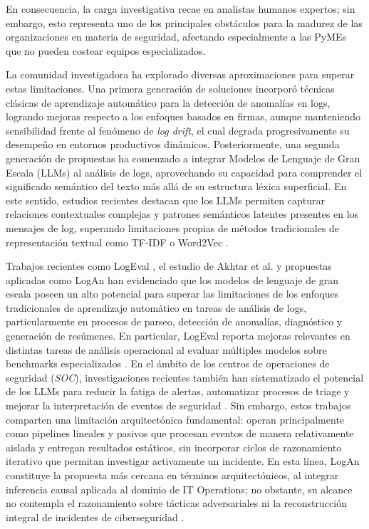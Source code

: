 En consecuencia, la carga investigativa recae en analistas humanos expertos; sin embargo, esto representa uno de los principales obstáculos para la madurez de las organizaciones en materia de seguridad, afectando especialmente a las PyMEs que no pueden costear equipos especializados.

La comunidad investigadora ha explorado diversas aproximaciones para superar estas limitaciones. Una primera generación de soluciones incorporó técnicas clásicas de aprendizaje automático para la detección de anomalías en logs, logrando mejoras respecto a los enfoques basados en firmas, aunque manteniendo sensibilidad frente al fenómeno de \textit{log drift}, el cual degrada progresivamente su desempeño en entornos productivos dinámicos. Posteriormente, una segunda generación de propuestas ha comenzado a integrar Modelos de Lenguaje de Gran Escala (LLMs) al análisis de logs, aprovechando su capacidad para comprender el significado semántico del texto más allá de su estructura léxica superficial. En este sentido, estudios recientes destacan que los LLMs permiten capturar relaciones contextuales complejas y patrones semánticos latentes presentes en los mensajes de log, superando limitaciones propias de métodos tradicionales de representación textual como TF-IDF o Word2Vec \cite{cui2025logeval,Akhtar2025}.

Trabajos recientes como LogEval \cite{cui2025logeval}, el estudio de Akhtar et al. \cite{Akhtar2025} y propuestas aplicadas como LogAn \cite{Gupta2025} han evidenciado que los modelos de lenguaje de gran escala poseen un alto potencial para superar las limitaciones de los enfoques tradicionales de aprendizaje automático en tareas de análisis de logs, particularmente en procesos de parseo, detección de anomalías, diagnóstico y generación de resúmenes. En particular, LogEval reporta mejoras relevantes en distintas tareas de análisis operacional al evaluar múltiples modelos sobre benchmarks especializados \cite{cui2025logeval}. En el ámbito de los centros de operaciones de seguridad (\textit{SOC}), investigaciones recientes también han sistematizado el potencial de los LLMs para reducir la fatiga de alertas, automatizar procesos de triage y mejorar la interpretación de eventos de seguridad \cite{Akhtar2025}. Sin embargo, estos trabajos comparten una limitación arquitectónica fundamental: operan principalmente como pipelines lineales y pasivos que procesan eventos de manera relativamente aislada y entregan resultados estáticos, sin incorporar ciclos de razonamiento iterativo que permitan investigar activamente un incidente. En esta línea, LogAn constituye la propuesta más cercana en términos arquitectónicos, al integrar inferencia causal aplicada al dominio de IT Operations; no obstante, su alcance no contempla el razonamiento sobre tácticas adversariales ni la reconstrucción integral de incidentes de ciberseguridad \cite{Gupta2025}.

